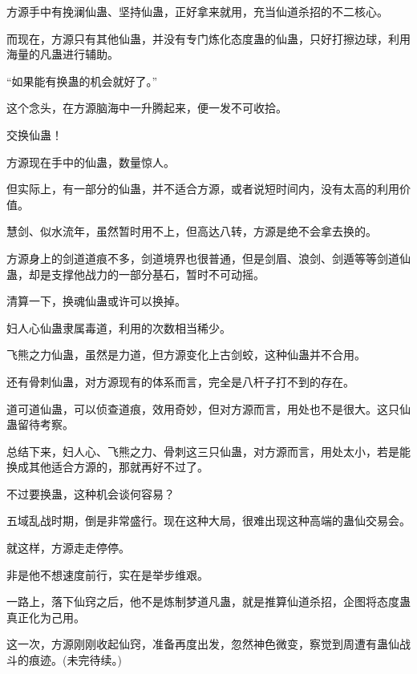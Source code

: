 \begin{this_body}
方源手中有挽澜仙蛊、坚持仙蛊，正好拿来就用，充当仙道杀招的不二核心。

而现在，方源只有其他仙蛊，并没有专门炼化态度蛊的仙蛊，只好打擦边球，利用海量的凡蛊进行辅助。

“如果能有换蛊的机会就好了。”

这个念头，在方源脑海中一升腾起来，便一发不可收拾。

交换仙蛊！

方源现在手中的仙蛊，数量惊人。

但实际上，有一部分的仙蛊，并不适合方源，或者说短时间内，没有太高的利用价值。

慧剑、似水流年，虽然暂时用不上，但高达八转，方源是绝不会拿去换的。

方源身上的剑道道痕不多，剑道境界也很普通，但是剑眉、浪剑、剑遁等等剑道仙蛊，却是支撑他战力的一部分基石，暂时不可动摇。

清算一下，换魂仙蛊或许可以换掉。

妇人心仙蛊隶属毒道，利用的次数相当稀少。

飞熊之力仙蛊，虽然是力道，但方源变化上古剑蛟，这种仙蛊并不合用。

还有骨刺仙蛊，对方源现有的体系而言，完全是八杆子打不到的存在。

道可道仙蛊，可以侦查道痕，效用奇妙，但对方源而言，用处也不是很大。这只仙蛊留待考察。

总结下来，妇人心、飞熊之力、骨刺这三只仙蛊，对方源而言，用处太小，若是能换成其他适合方源的，那就再好不过了。

不过要换蛊，这种机会谈何容易？

五域乱战时期，倒是非常盛行。现在这种大局，很难出现这种高端的蛊仙交易会。

就这样，方源走走停停。

非是他不想速度前行，实在是举步维艰。

一路上，落下仙窍之后，他不是炼制梦道凡蛊，就是推算仙道杀招，企图将态度蛊真正化为己用。

这一次，方源刚刚收起仙窍，准备再度出发，忽然神色微变，察觉到周遭有蛊仙战斗的痕迹。(未完待续。)

\end{this_body}


